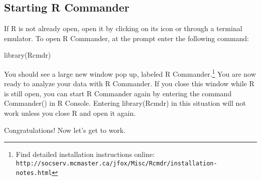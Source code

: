  \subsection{Starting R Commander}
 If R is not already open, open it by clicking on its icon or through a terminal emulator. To open R Commander, at the prompt enter the following command:

 library(Rcmdr)

 You should see a large new window pop up, labeled R Commander.\footnote{Find detailed installation instructions online: \texttt{http://socserv.mcmaster.ca/jfox/Misc/Rcmdr/installation-notes.html}} You are now ready to analyze your data with R Commander. If you close this window while R is still open, you can start R Commander again by entering the command Commander() in R Console. Entering library(Rcmdr) in this situation will not work unless you close R and open it again.

Congratulations! Now let's get to work.